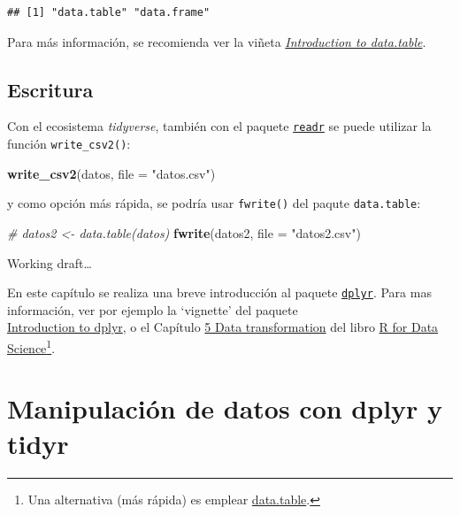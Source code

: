 \documentclass[
]{book}
\newenvironment{Shaded}{\begin{snugshade}}{\end{snugshade}}
\newcommand{\AttributeTok}[1]{\textcolor[rgb]{0.13,0.29,0.53}{#1}}
\newcommand{\CommentTok}[1]{\textcolor[rgb]{0.56,0.35,0.01}{\textit{#1}}}
\newcommand{\FunctionTok}[1]{\textcolor[rgb]{0.13,0.29,0.53}{\textbf{#1}}}
\newcommand{\NormalTok}[1]{#1}
\newcommand{\StringTok}[1]{\textcolor[rgb]{0.31,0.60,0.02}{#1}}
\begin{document}
\begin{verbatim}
## [1] "data.table" "data.frame"
\end{verbatim}

Para más información, se recomienda ver la viñeta \href{https://rdatatable.gitlab.io/data.table/articles/datatable-intro.html}{\emph{Introduction to data.table}}.

\subsection{Escritura}\label{writer}

Con el ecosistema \emph{tidyverse}, también con el paquete \href{https://readr.tidyverse.org}{\texttt{readr}} se puede utilizar la función \texttt{write\_csv2()}:

\begin{Shaded}
\begin{Highlighting}[]
\FunctionTok{write\_csv2}\NormalTok{(datos, }\AttributeTok{file =} \StringTok{"datos.csv"}\NormalTok{)}
\end{Highlighting}
\end{Shaded}

y como opción más rápida, se podría usar \texttt{fwrite()} del paqute \texttt{data.table}:

\begin{Shaded}
\begin{Highlighting}[]
\CommentTok{\# datos2 \textless{}{-} data.table(datos)}
\FunctionTok{fwrite}\NormalTok{(datos2, }\AttributeTok{file =} \StringTok{"datos2.csv"}\NormalTok{)}
\end{Highlighting}
\end{Shaded}

Working draft\ldots{}

En este capítulo se realiza una breve introducción al paquete \href{https://dplyr.tidyverse.org/index.html}{\texttt{dplyr}}.
Para mas información, ver por ejemplo la `vignette' del paquete\\
\href{https://cran.rstudio.com/web/packages/dplyr/vignettes/dplyr.html}{Introduction to dplyr},
o el Capítulo \href{http://r4ds.had.co.nz/transform.html}{5 Data transformation} del libro
\href{http://r4ds.had.co.nz}{R for Data Science}\footnote{Una alternativa (más rápida) es emplear
  \href{https://rdatatable.gitlab.io/data.table}{data.table}.}.

\section{Manipulación de datos con dplyr y tidyr}\label{dplyr}
\end{document}
